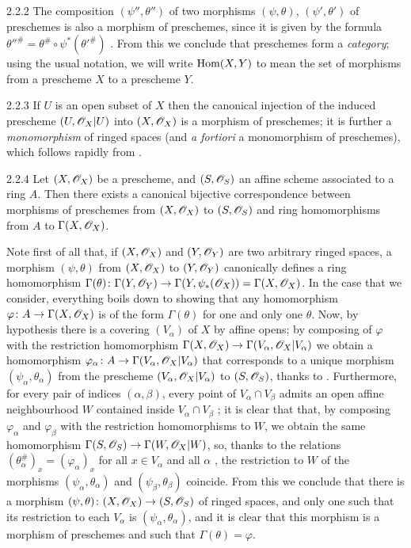 \documentclass{book}
\begin{document}
\begin{env}{2.2.2}
\label{env-1.2.2.2}
The composition $(\psi'',\theta'')$ of two morphisms
$(\psi,\theta)$, $(\psi',\theta')$ of preschemes is also a morphism of
preschemes, since it is given by the formula
$\theta''^\#=\theta^\#\circ\psi^\ast(\theta'^\#)$ . From this
we conclude that preschemes form a \emph{category}; using the usual notation, we
will write ${\mathop{\mathrm{Hom}}\nolimits}(X,Y)$ to mean the set of morphisms from a prescheme $X$ to a
prescheme $Y$.
\end{env}

\begin{env}[Example]{2.2.3}
\label{exm-1.2.2.3}
If $U$ is an open subset of $X$ then the canonical
injection  of the induced prescheme $(U,\mathscr{O}_X|U)$ into
$(X,\mathscr{O}_X)$ is a morphism of preschemes; it is further a \emph{monomorphism} of
ringed spaces (and \emph{a fortiori} a monomorphism of preschemes), which
follows rapidly from .
\end{env}

\begin{envs}[Proposition]{2.2.4}
\label{prop-1.2.2.4}
Let $(X,\mathscr{O}_X)$ be a prescheme, and $(S,\mathscr{O}_S)$ an
affine scheme associated to a ring $A$. Then there exists a canonical bijective
correspondence between morphisms of preschemes from $(X,\mathscr{O}_X)$ to $(S,\mathscr{O}_S)$ and
ring homomorphisms from $A$ to $\Gamma(X,\mathscr{O}_X)$.
\end{envs}

Note first of all that, if $(X,\mathscr{O}_X)$ and $(Y,\mathscr{O}_Y)$ are two arbitrary ringed spaces,
a morphism $(\psi,\theta)$ from $(X,\mathscr{O}_X)$ to $(Y,\mathscr{O}_Y)$ canonically defines a ring
homomorphism
$\Gamma(\theta)\colon\Gamma(Y,\mathscr{O}_Y)\to\Gamma(Y,\psi_\ast(\mathscr{O}_X))=\Gamma(X,\mathscr{O}_X)$.
In the case that we consider, everything boils down to showing that any
homomorphism $\varphi\colon A\to\Gamma(X,\mathscr{O}_X)$ is of the form $\Gamma(\theta)$
for one and only one $\theta$. Now, by hypothesis there is a covering
$(V_\alpha)$ of $X$ by affine opens; by composing of $\varphi$ with the
restriction homomorphism $\Gamma(X,\mathscr{O}_X)\to\Gamma(V_\alpha,\mathscr{O}_X|V_\alpha)$ we
obtain a homomorphism $\varphi_\alpha\colon A\to\Gamma(V_\alpha,\mathscr{O}_X|V_\alpha)$
that corresponds to a unique morphism $(\psi_\alpha,\theta_\alpha)$ from the
prescheme $(V_\alpha,\mathscr{O}_X|V_\alpha)$ to $(S,\mathscr{O}_S)$, thanks to .
Furthermore, for every pair of indices $(\alpha,\beta)$, every point of
$V_\alpha\cap V_\beta$ admits an open affine neighbourhood $W$ contained inside
$V_\alpha\cap V_\beta$ ; it is clear that that, by composing
$\varphi_\alpha$ and $\varphi_\beta$ with the restriction homomorphisms to $W$,
we obtain the same homomorphism $\Gamma(S,\mathscr{O}_S)\to\Gamma(W,\mathscr{O}_X|W)$, so, thanks
to the relations $(\theta_\alpha^\#)_x=(\varphi_\alpha)_x$ for all $x\in
V_\alpha$ and all $\alpha$ , the restriction to $W$ of the morphisms
$(\psi_\alpha,\theta_\alpha)$ and $(\psi_\beta,\theta_\beta)$ coincide. From
this we conclude that there is a morphism
$(\psi,\theta)\colon(X,\mathscr{O}_X)\to(S,\mathscr{O}_S)$ of ringed spaces, and only one such
that its restriction to each $V_\alpha$ is $(\psi_\alpha,\theta_\alpha)$, and it
is clear that this morphism is a morphism of preschemes and such that
$\Gamma(\theta)=\varphi$.
\end{document}
